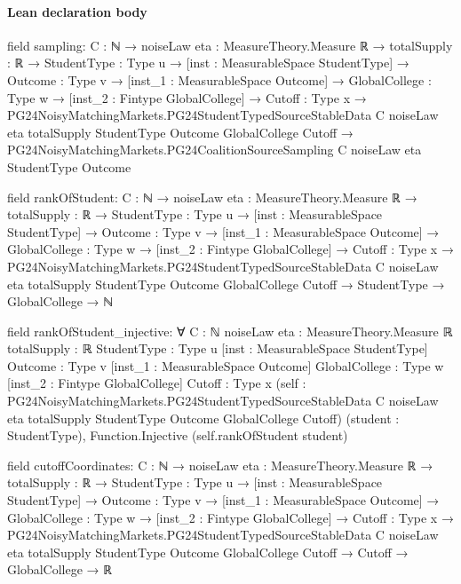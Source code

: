 \documentclass[10pt]{article}
\begin{document}
\paragraph{Lean declaration body}
\begin{ReviewVerbatim}
field sampling:
{C : ℕ} →
  {noiseLaw eta : MeasureTheory.Measure ℝ} →
    {totalSupply : ℝ} →
      {StudentType : Type u} →
        [inst : MeasurableSpace StudentType] →
          {Outcome : Type v} →
            [inst_1 : MeasurableSpace Outcome] →
              {GlobalCollege : Type w} →
                [inst_2 : Fintype GlobalCollege] →
                  {Cutoff : Type x} →
                    PG24NoisyMatchingMarkets.PG24StudentTypedSourceStableData C noiseLaw eta totalSupply StudentType
                        Outcome GlobalCollege Cutoff →
                      PG24NoisyMatchingMarkets.PG24CoalitionSourceSampling C noiseLaw eta StudentType Outcome

field rankOfStudent:
{C : ℕ} →
  {noiseLaw eta : MeasureTheory.Measure ℝ} →
    {totalSupply : ℝ} →
      {StudentType : Type u} →
        [inst : MeasurableSpace StudentType] →
          {Outcome : Type v} →
            [inst_1 : MeasurableSpace Outcome] →
              {GlobalCollege : Type w} →
                [inst_2 : Fintype GlobalCollege] →
                  {Cutoff : Type x} →
                    PG24NoisyMatchingMarkets.PG24StudentTypedSourceStableData C noiseLaw eta totalSupply StudentType
                        Outcome GlobalCollege Cutoff →
                      StudentType → GlobalCollege → ℕ

field rankOfStudent_injective:
∀ {C : ℕ} {noiseLaw eta : MeasureTheory.Measure ℝ} {totalSupply : ℝ} {StudentType : Type u}
  [inst : MeasurableSpace StudentType] {Outcome : Type v} [inst_1 : MeasurableSpace Outcome] {GlobalCollege : Type w}
  [inst_2 : Fintype GlobalCollege] {Cutoff : Type x}
  (self :
    PG24NoisyMatchingMarkets.PG24StudentTypedSourceStableData C noiseLaw eta totalSupply StudentType Outcome
      GlobalCollege Cutoff)
  (student : StudentType), Function.Injective (self.rankOfStudent student)

field cutoffCoordinates:
{C : ℕ} →
  {noiseLaw eta : MeasureTheory.Measure ℝ} →
    {totalSupply : ℝ} →
      {StudentType : Type u} →
        [inst : MeasurableSpace StudentType] →
          {Outcome : Type v} →
            [inst_1 : MeasurableSpace Outcome] →
              {GlobalCollege : Type w} →
                [inst_2 : Fintype GlobalCollege] →
                  {Cutoff : Type x} →
                    PG24NoisyMatchingMarkets.PG24StudentTypedSourceStableData C noiseLaw eta totalSupply StudentType
                        Outcome GlobalCollege Cutoff →
                      Cutoff → GlobalCollege → ℝ


\end{ReviewVerbatim}
\end{document}
